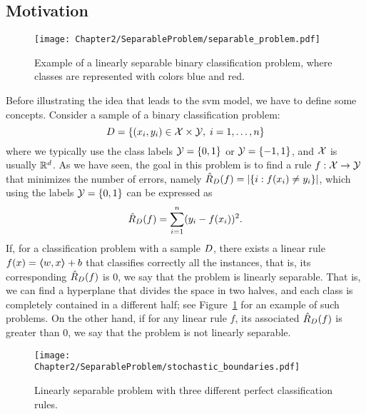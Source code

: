 \subsection{Motivation}
%
\begin{figure}[t!]
    \centering
    \texttt{[image: Chapter2/SeparableProblem/separable\_problem.pdf]}
    \caption{Example of a linearly separable binary classification problem, where classes are represented with colors blue and red.}
    \label{fig:separable_problem}
\end{figure}
Before illustrating the idea that leads to the \acrshort{svm} model, we have to define some concepts. Consider a sample of a binary classification problem:
\begin{equation}
    \nonumber
    D = \left\{(x_i, y_i) \in \mathcal{X} \times \mathcal{Y}, \; i=1, \ldots, n\right\}
\end{equation}
where we typically use the class labels $\mathcal{Y} = \left\{0, 1\right\}$ or $\mathcal{Y}=\left\{-1, 1\right\}$, and $\mathcal{X}$ is usually $\mathbb{R}^d$. As we have seen, the goal in this problem is to find a rule $f: \mathcal{X} \to \mathcal{Y}$ that minimizes the number of errors, namely $\hat{R}_{D}(f) = \left|\left\{i: f(x_i) \neq y_i\right\}\right|$, which using the labels $\mathcal{Y} = \left\{0, 1\right\}$ can be expressed as
\begin{equation}
    \nonumber
    \hat{R}_{D}(f) = \sum_{i=1}^n (y_i - f(x_i))^2 .
\end{equation}
If, for a classification problem with a sample $D$, there exists a linear rule $f(x) = \bm{\left\langle} w, x \bm{\right\rangle} + b$ that classifies correctly all the instances, that is, its corresponding $\hat{R}_{D}(f)$ is $0$, we say that the problem is linearly separable. That is, we can find a hyperplane that divides the space in two halves, and each class is completely contained in a different half; see Figure~\ref{fig:separable_problem} for an example of such problems.
On the other hand, if for any linear rule $f$, its associated $\hat{R}_{D}(f)$ is greater than $0$, we say that the problem is not linearly separable. 
%
\begin{figure}[t!]
    \centering
    \texttt{[image: Chapter2/SeparableProblem/stochastic\_boundaries.pdf]}
    \caption{Linearly separable problem with three different perfect classification rules.}
    \label{fig:stochastic_boundaries}
\end{figure}

